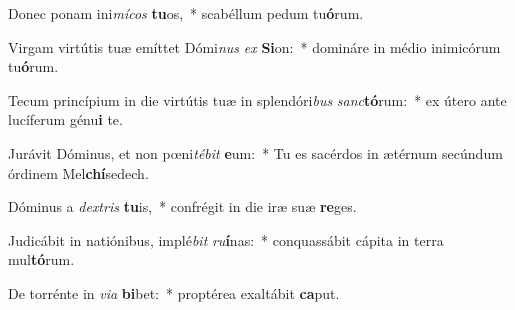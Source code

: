 \item Donec ponam ini\textit{mí}\textit{cos} \textbf{tu}os,~* scabéllum pedum tu\textbf{ó}rum.
\item Virgam virtútis tuæ emíttet Dómi\textit{nus} \textit{ex} \textbf{Si}on:~* domináre in médio inimicórum tu\textbf{ó}rum.
\item Tecum princípium in die virtútis tuæ in splendóri\textit{bus} \textit{sanc}\textbf{tó}rum:~* ex útero ante lucíferum génu\textbf{i} te.
\item Jurávit Dóminus, et non pœni\textit{té}\textit{bit} \textbf{e}um:~* Tu es sacérdos in ætérnum secúndum órdinem Mel\textbf{chí}sedech.
\item Dóminus a \textit{dex}\textit{tris} \textbf{tu}is,~* confrégit in die iræ suæ \textbf{re}ges.
\item Judicábit in natiónibus, implé\textit{bit} \textit{ru}\textbf{í}nas:~* conquassábit cápita in terra mul\textbf{tó}rum.
\item De torrénte in \textit{vi}\textit{a} \textbf{bi}bet:~* proptérea exaltábit \textbf{ca}put.
